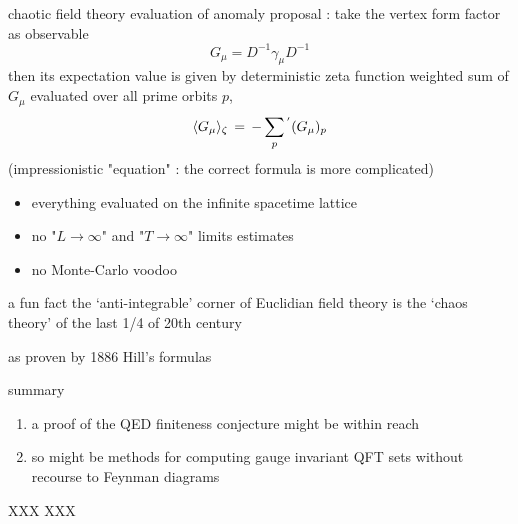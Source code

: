 \begin{frame}{chaotic field theory evaluation of anomaly}
\textcolor{red!80!black}{proposal :}
take the vertex form factor as observable
\[
  G_\mu = 
  D^{-1}\gamma_\mu
  D^{-1}
\]
then its expectation value is given by deterministic zeta function 
weighted sum of $G_\mu$ evaluated over all prime orbits $p$, 
\[
\langle {G_\mu} \rangle_\zeta \,=\,
- \sum_p{}^{'} (G_\mu)_p
\]
(impressionistic "equation" : the correct formula is more complicated)

\bigskip
\begin{itemize}
  \item 
everything evaluated on the \textcolor{red!80!black}{infinite} spacetime lattice
  \item 
\textcolor{red!80!black}{no "$L\to\infty$" and "$T\to\infty$" limits} estimates
  \item 
no Monte-Carlo voodoo
\end{itemize}

\end{frame}

\begin{frame}{a fun fact}
the `anti-integrable' corner of Euclidian field theory is the `chaos theory' 
of the last 1/4 of 20th century

\bigskip

as proven by 1886 Hill's formulas
\end{frame}

\begin{frame}{summary}
\begin{enumerate}
              \item
a proof of the QED finiteness conjecture might be within reach

              \item
so might be methods for computing gauge invariant QFT sets without
recourse to Feynman diagrams

\end{enumerate}

\vfill
\bigskip{}
\end{frame}

\begin{frame}{XXX}
XXX
\end{frame}

